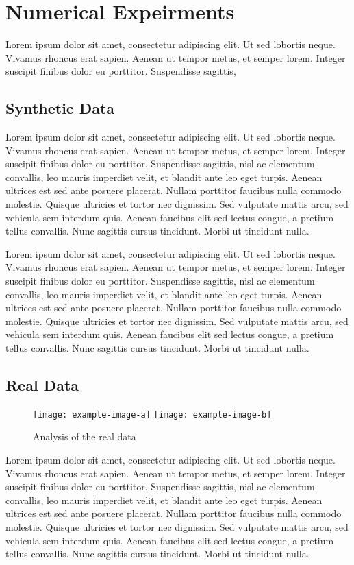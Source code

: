 \section{Numerical Expeirments}
Lorem ipsum dolor sit amet, consectetur adipiscing elit. Ut sed lobortis neque. Vivamus rhoncus erat sapien. Aenean ut tempor metus, et semper lorem. Integer suscipit finibus dolor eu porttitor. Suspendisse sagittis, 

\subsection{Synthetic Data}
Lorem ipsum dolor sit amet, consectetur adipiscing elit. Ut sed lobortis neque. Vivamus rhoncus erat sapien. Aenean ut tempor metus, et semper lorem. Integer suscipit finibus dolor eu porttitor. Suspendisse sagittis, nisl ac elementum convallis, leo mauris imperdiet velit, et blandit ante leo eget turpis. Aenean ultrices est sed ante posuere placerat. Nullam porttitor faucibus nulla commodo molestie. Quisque ultricies et tortor nec dignissim. Sed vulputate mattis arcu, sed vehicula sem interdum quis. Aenean faucibus elit sed lectus congue, a pretium tellus convallis. Nunc sagittis cursus tincidunt. Morbi ut tincidunt nulla.

Lorem ipsum dolor sit amet, consectetur adipiscing elit. Ut sed lobortis neque. Vivamus rhoncus erat sapien. Aenean ut tempor metus, et semper lorem. Integer suscipit finibus dolor eu porttitor. Suspendisse sagittis, nisl ac elementum convallis, leo mauris imperdiet velit, et blandit ante leo eget turpis. Aenean ultrices est sed ante posuere placerat. Nullam porttitor faucibus nulla commodo molestie. Quisque ultricies et tortor nec dignissim. Sed vulputate mattis arcu, sed vehicula sem interdum quis. Aenean faucibus elit sed lectus congue, a pretium tellus convallis. Nunc sagittis cursus tincidunt. Morbi ut tincidunt nulla.

\subsection{Real Data}
\begin{figure*}
    \centering 
    \texttt{[image: example-image-a]}
    \texttt{[image: example-image-b]}

    \caption{Analysis of the real data}
\end{figure*}

Lorem ipsum dolor sit amet, consectetur adipiscing elit. Ut sed lobortis neque. Vivamus rhoncus erat sapien. Aenean ut tempor metus, et semper lorem. Integer suscipit finibus dolor eu porttitor. Suspendisse sagittis, nisl ac elementum convallis, leo mauris imperdiet velit, et blandit ante leo eget turpis. Aenean ultrices est sed ante posuere placerat. Nullam porttitor faucibus nulla commodo molestie. Quisque ultricies et tortor nec dignissim. Sed vulputate mattis arcu, sed vehicula sem interdum quis. Aenean faucibus elit sed lectus congue, a pretium tellus convallis. Nunc sagittis cursus tincidunt. Morbi ut tincidunt nulla.

